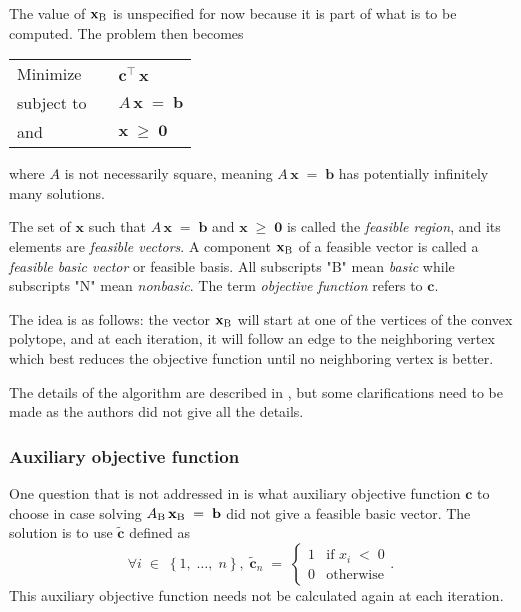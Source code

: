 \documentclass{report}
\theoremstyle{definition}
\theoremstyle{plain}
\begin{document}
The value of $\mathbf x_{\rm B}$ is unspecified for now because it is part of
what is to be computed. The problem then becomes
\begin{center}
	\begin{tabular}{|lll|}
		\hline
		Minimize & & $\mathbf c^\top\,\mathbf x$ \\
		subject to & & $A\,\mathbf x\;=\;\mathbf b$ \\
		and & & $\mathbf x\;\geqslant\;\mathbf 0$ \\
		\hline
	\end{tabular}
\end{center}
where $A$ is not necessarily square, meaning $A\,\mathbf x\;=\;\mathbf b$ has
potentially infinitely many solutions.

The set of $\mathbf x$ such that $A\,\mathbf x\;=\;\mathbf b$ and $\mathbf
x\;\geqslant\;\mathbf 0$ is called the \emph{feasible region}, and its elements
are \emph{feasible vectors}. A component $\mathbf x_{\rm B}$ of a feasible
vector is called a \emph{feasible basic vector} or feasible basis. All
subscripts "B" mean \emph{basic} while subscripts "N" mean \emph{nonbasic}. The
term \emph{objective function} refers to $\mathbf c$.

The idea is as follows: the vector $\mathbf x_{\rm B}$ will start at one of the
vertices of the convex polytope, and at each iteration, it will follow an edge
to the neighboring vertex which best reduces the objective function until no
neighboring vertex is better.

The details of the algorithm are described in \cite{num_rec}, but some
clarifications need to be made as the authors did not give all the details.

\subsubsection{Auxiliary objective function}
One question that is not addressed in \cite{num_rec} is what auxiliary
objective function $\mathbf c$ to choose in case solving
$A_{\rm B}\,\mathbf x_{\rm B}\;=\;\mathbf b$ did not give a feasible basic
vector. The solution is to use $\tilde{\mathbf c}$ defined as
\[
	\forall i\;\in\;\left\{1,\;\ldots,\;n\right\},\;\tilde{\mathbf c}_n
		\;=\;\begin{cases}
			1 & \text{if } x_i\;<\;0 \\
			0 & \text{otherwise}
		\end{cases}.
\]
This auxiliary objective function needs not be calculated again at each
iteration.
\end{document}
